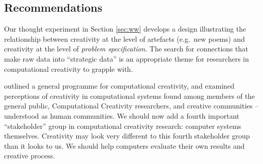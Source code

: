 \subsection{Recommendations} \label{sec:recommendations}



Our thought experiment in Section \ref{sec:ww} develops a design
illustrating the relationship between creativity at the level of
artefacts (e.g.~new poems) and creativity at the level of
\emph{problem specification}.  The search for connections that make
raw data into ``strategic data'' is an appropriate theme for
researchers in computational creativity to grapple with.


 outlined a general programme
for computational creativity, and examined perceptions of creativity
in computational systems found among members of the general public,
Computational Creativity researchers, and creative communities --
understood as human communities.  We should now add a fourth important
``stakeholder'' group in computational creativity research: computer
systems themselves.  Creativity may look very different to this fourth
stakeholder group than it looks to us.  We should help computers
evaluate their own results and creative process.

